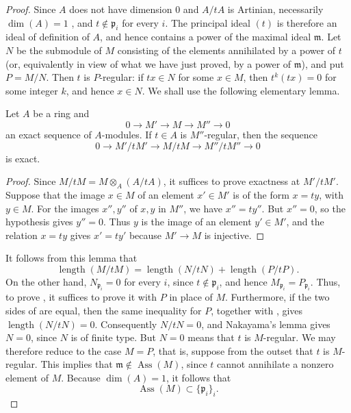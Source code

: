 
\begin{proof}
Since $A$ does not have dimension $0$ and $A/tA$ is Artinian, necessarily $\dim(A)=1$ , and $t\notin\mathfrak p_i$ for every $i$.
The principal ideal $(t)$ is therefore an ideal of definition of $A$, and hence contains a power of the maximal ideal $\mathfrak m$.
Let $N$ be the submodule of $M$ consisting of the elements annihilated by a power of $t$ (or, equivalently in view of what we have just proved, by a power of $\mathfrak m$), and put $P=M/N$.
Then $t$ is $P$-regular: if $tx\in N$ for some $x\in M$, then $t^k(tx)=0$ for some integer $k$, and hence $x\in N$.
We shall use the following elementary lemma.

\begin{lemma}[3.4.1.4]
\label{IV.3.4.1.4}
Let $A$ be a ring and
\[
0\longrightarrow M'\longrightarrow M\longrightarrow M''\longrightarrow 0
\]
an exact sequence of $A$-modules.
If $t\in A$ is $M''$-regular, then the sequence
\[
0\longrightarrow M'/tM'
 \longrightarrow M/tM
 \longrightarrow M''/tM''
 \longrightarrow 0
\]
is exact.
\end{lemma}

\begin{proof}
Since $M/tM=M\otimes_A(A/tA)$, it suffices to prove exactness at $M'/tM'$.
Suppose that the image $x\in M$ of an element $x'\in M'$ is of the form $x=ty$, with $y\in M$.
For the images $x'',y''$ of $x,y$ in $M''$, we have $x''=ty''$.
But $x''=0$, so the hypothesis gives $y''=0$.
Thus $y$ is the image of an element $y'\in M'$, and the relation $x=ty$ gives $x'=ty'$ because $M'\to M$ is injective.
\end{proof}

It follows from this lemma that
\[
\label{IV.3.4.1.5}
\operatorname{length}(M/tM)
  =
  \operatorname{length}(N/tN)
  +
  \operatorname{length}(P/tP).
\tag{3.4.1.5}
\]
On the other hand, $N_{\mathfrak p_i}=0$ for every $i$, since $t\notin\mathfrak p_i$, and hence $M_{\mathfrak p_i}=P_{\mathfrak p_i}$.
Thus, to prove , it suffices to prove it with $P$ in place of $M$.
Furthermore, if the two sides of  are equal, then the same inequality for $P$, together with , gives $\operatorname{length}(N/tN)=0$.
Consequently $N/tN=0$, and Nakayama's lemma gives $N=0$, since $N$ is of finite type.
But $N=0$ means that $t$ is $M$-regular.
We may therefore reduce to the case $M=P$, that is, suppose from the outset that $t$ is $M$-regular.
This implies that $\mathfrak m\notin\operatorname{Ass}(M)$, since $t$ cannot annihilate a nonzero element of $M$.
Because $\dim(A)=1$, it follows that
\[
\operatorname{Ass}(M)\subset\{\mathfrak p_i\}_i.
\]


\end{proof}
